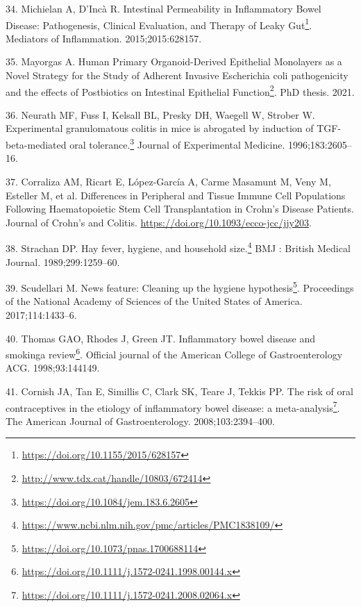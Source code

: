 \documentclass[
  a4paper,
]{book}
\DeclareRobustCommand{\href}[2]{#2\footnote{\url{#1}}}
\newlength{\cslhangindent}
\newlength{\cslentryspacingunit} %
\newenvironment{CSLReferences}[2] %
 {%
  \setlength{\parindent}{0pt}
  \ifodd #1
  \let\oldpar\par
  \def\par{\hangindent=\cslhangindent\oldpar}
  \fi
  \setlength{\parskip}{#2\cslentryspacingunit}
 }%
 {}
\begin{document}
\begin{CSLReferences}{0}{0}
\leavevmode{}%
34. Michielan A, D'Incà R. \href{https://doi.org/10.1155/2015/628157}{Intestinal Permeability in Inflammatory Bowel Disease: Pathogenesis, Clinical Evaluation, and Therapy of Leaky Gut}. Mediators of Inflammation. 2015;2015:628157.

\leavevmode{}%
35. Mayorgas A. \href{http://www.tdx.cat/handle/10803/672414}{Human Primary Organoid-Derived Epithelial Monolayers as a Novel Strategy for the Study of Adherent Invasive Escherichia coli pathogenicity and the effects of Postbiotics on Intestinal Epithelial Function}. PhD thesis. 2021.

\leavevmode{}%
36. Neurath MF, Fuss I, Kelsall BL, Presky DH, Waegell W, Strober W. \href{https://doi.org/10.1084/jem.183.6.2605}{Experimental granulomatous colitis in mice is abrogated by induction of TGF-beta-mediated oral tolerance.} Journal of Experimental Medicine. 1996;183:2605--16.

\leavevmode{}%
37. Corraliza AM, Ricart E, López-García A, Carme Masamunt M, Veny M, Esteller M, et al. Differences in Peripheral and Tissue Immune Cell Populations Following Haematopoietic Stem Cell Transplantation in Crohn{'}s Disease Patients. Journal of Crohn's and Colitis. \url{https://doi.org/10.1093/ecco-jcc/jjy203}.

\leavevmode{}%
38. Strachan DP. \href{https://www.ncbi.nlm.nih.gov/pmc/articles/PMC1838109/}{Hay fever, hygiene, and household size.} BMJ : British Medical Journal. 1989;299:1259--60.

\leavevmode{}%
39. Scudellari M. \href{https://doi.org/10.1073/pnas.1700688114}{News feature: Cleaning up the hygiene hypothesis}. Proceedings of the National Academy of Sciences of the United States of America. 2017;114:1433--6.

\leavevmode{}%
40. Thomas GAO, Rhodes J, Green JT. \href{https://doi.org/10.1111/j.1572-0241.1998.00144.x}{Inflammatory bowel disease and smoking{\textemdash}a review}. Official journal of the American College of Gastroenterology \textbar{} ACG. 1998;93:144149.

\leavevmode{}%
41. Cornish JA, Tan E, Simillis C, Clark SK, Teare J, Tekkis PP. \href{https://doi.org/10.1111/j.1572-0241.2008.02064.x}{The risk of oral contraceptives in the etiology of inflammatory bowel disease: a meta-analysis}. The American Journal of Gastroenterology. 2008;103:2394--400.


\end{CSLReferences}
\end{document}
